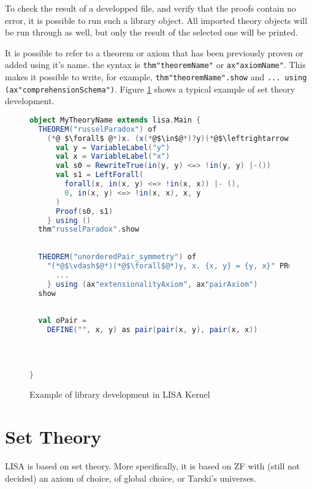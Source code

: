 To check the result of a developped file, and verify that the proofs contain no error, it is possible to run such a library object. All imported theory objects will be run through as well, but only the result of the selected one will be printed. 

It is possible to refer to a theorem or axiom that has been previously proven or added using it's name. the syntax is \lstinline{thm"theoremName"}{} or \lstinline{ax"axiomName"}{}. This makes it possible to write, for example, \lstinline{thm"theoremName".show}{} and \lstinline{... using (ax"comprehensionSchema")}{}. Figure \ref{fig:kernellibrary} shows a typical example of set theory development.




\begin{figure}
\begin{lstlisting}[language=Scala, frame=single]
object MyTheoryName extends lisa.Main {
  THEOREM("russelParadox") of 
    (*@ $\forall$ @*)x. (x(*@$\in$@*)?y)(*@$\leftrightarrow$@*) (*@$\neg$@*)(x(*@$\in$@*)x)(*@$\vdash$@*) PROOF {
      val y = VariableLabel("y")
      val x = VariableLabel("x")
      val s0 = RewriteTrue(in(y, y) <=> !in(y, y) |-())
      val s1 = LeftForall(
        forall(x, in(x, y) <=> !in(x, x)) |- (),
        0, in(x, y) <=> !in(x, x), x, y
      )
      Proof(s0, s1)
    } using ()
  thm"russelParadox".show
  
  
  THEOREM("unorderedPair_symmetry") of
    "(*@$\vdash$@*)(*@$\forall$@*)y, x. {x, y} = {y, x}" PROOF {
      ...
    } using (ax"extensionalityAxiom", ax"pairAxiom")
  show
  
  
  val oPair = 
    DEFINE("", x, y) as pair(pair(x, y), pair(x, x))
    
    
    
  
}
\end{lstlisting}
\caption{Example of library development in LISA Kernel}
\label{fig:kernellibrary}
\end{figure}





\chapter{Set Theory}
\label{chapt:settheory}
LISA is based on set theory. More specifically, it is based on ZF with (still not decided) an axiom of choice, of global choice, or Tarski's universes.

